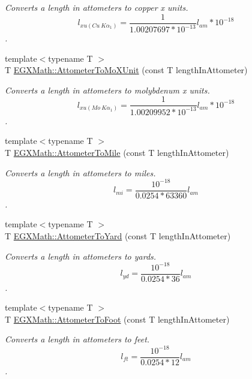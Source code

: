 \begin{DoxyCompactItemize}
\begin{DoxyCompactList}\small\item\em Converts a length in attometers to copper x units. \[ l_{xu(Cu\ K\alpha_1)}= \frac{1}{1.00207697*10^{-13}} l_{am} * 10^{-18} \]. \end{DoxyCompactList}\item 
{\footnotesize template$<$typename T $>$ }\\T \mbox{\hyperlink{group___e_g_x_math-_conversions-_length_conversions-_s_i-_attometer-_non-_s_i_ga79ec6f4ec4a97af05fe8f69b80805ab7}{E\+G\+X\+Math\+::\+Attometer\+To\+Mo\+X\+Unit}} (const T length\+In\+Attometer)
\begin{DoxyCompactList}\small\item\em Converts a length in attometers to molybdenum x units. \[ l_{xu(Mo\ K\alpha_1)}=\frac{1}{1.00209952*10^{-13}} l_{am} * 10^{-18} \]. \end{DoxyCompactList}\item 
{\footnotesize template$<$typename T $>$ }\\T \mbox{\hyperlink{group___e_g_x_math-_conversions-_length_conversions-_s_i-_attometer-_imperial_ga5525f722f588a2bb0a480c56d452fd3f}{E\+G\+X\+Math\+::\+Attometer\+To\+Mile}} (const T length\+In\+Attometer)
\begin{DoxyCompactList}\small\item\em Converts a length in attometers to miles. \[ l_{mi}=\frac{10^{-18}}{0.0254 * 63360} l_{am} \]. \end{DoxyCompactList}\item 
{\footnotesize template$<$typename T $>$ }\\T \mbox{\hyperlink{group___e_g_x_math-_conversions-_length_conversions-_s_i-_attometer-_imperial_gaa88d881301681b0864a866ef45ad041c}{E\+G\+X\+Math\+::\+Attometer\+To\+Yard}} (const T length\+In\+Attometer)
\begin{DoxyCompactList}\small\item\em Converts a length in attometers to yards. \[ l_{yd}= \frac{10^{-18}}{0.0254 * 36} l_{am} \]. \end{DoxyCompactList}\item 
{\footnotesize template$<$typename T $>$ }\\T \mbox{\hyperlink{group___e_g_x_math-_conversions-_length_conversions-_s_i-_attometer-_imperial_gaa4c9d59d58ec5811452592887a0261d9}{E\+G\+X\+Math\+::\+Attometer\+To\+Foot}} (const T length\+In\+Attometer)
\begin{DoxyCompactList}\small\item\em Converts a length in attometers to feet. \[ l_{ft}= \frac{10^{-18}}{0.0254 * 12} l_{am} \]. \end{DoxyCompactList}\item 

\end{DoxyCompactItemize}
